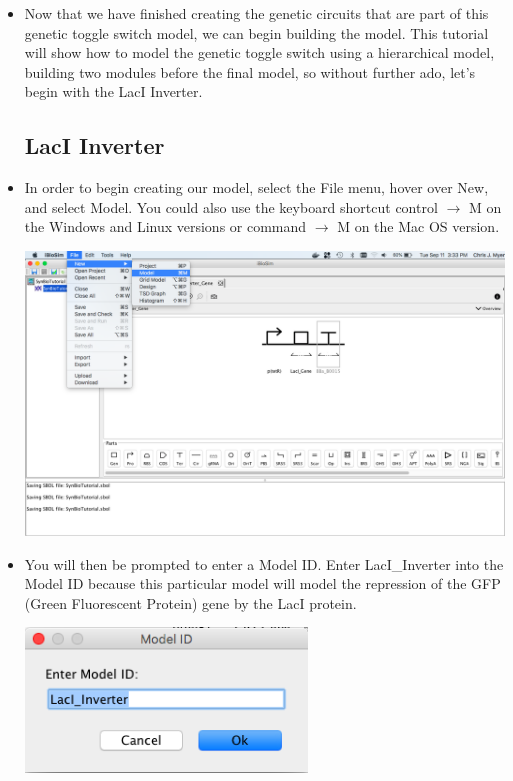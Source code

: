 \documentclass[titlepage,11pt]{article}
\begin{document}
\noindent
\begin{itemize}
\item Now that we have finished creating the genetic circuits that are part of this genetic toggle switch model, we can begin building the model. This tutorial will show how to model the genetic toggle switch using a hierarchical model, building two modules before the final model, so without further ado, let's begin with the LacI Inverter.

\subsection{LacI Inverter}
\item In order to begin creating our model, select the File menu, hover over New, and select Model. You could also use the keyboard shortcut control $\rightarrow$ M on the Windows and Linux versions or command $\rightarrow$ M on the Mac OS version.

\begin{center}
\includegraphics[width=160mm]{screenshots/newModel}
\end{center}

\item You will then be prompted to enter a Model ID. Enter LacI\_Inverter into the Model ID because this particular model will model the repression of the GFP (Green Fluorescent Protein) gene by the LacI protein.

\begin{center}
\includegraphics[width=75mm]{screenshots/ModelIdGT}
\end{center}


\end{itemize}
\end{document}
